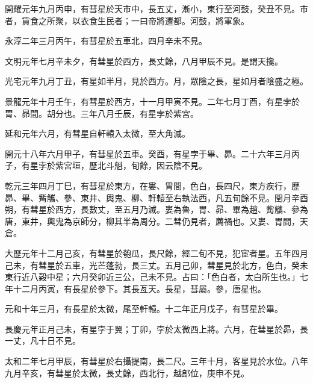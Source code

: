 \begin{pinyinscope}
 開耀元年九月丙申，有彗星於天市中，長五丈，漸小，東行至河鼓，癸丑不見。市者，貨食之所聚，以衣食生民者；一曰帝將遷都。河鼓，將軍象。



 永淳二年三月丙午，有彗星於五車北，四月辛未不見。



 文明元年七月辛未夕，有彗星於西方，長丈餘，八月甲辰不見。是謂天攙。



 光宅元年九月丁丑，有星如半月，見於西方。月，眾陰之長，星如月者陰盛之極。



 景龍元年十月壬午，有彗星於西方，十一月甲寅不見。二年七月丁酉，有星孛於胃、昴間。胡分也。三年八月壬辰，有星孛於紫宮。



 延和元年六月，有彗星自軒轅入太微，至大角滅。



 開元十八年六月甲子，有彗星於五車。癸酉，有星孛于畢、昴。二十六年三月丙子，有星孛於紫宮垣，歷北斗魁，旬餘，因云陰不見。



 乾元三年四月丁巳，有彗星於東方，在婁、胃間，色白，長四尺，東方疾行，歷昴、畢、觜觿、參、東井、輿鬼、柳、軒轅至右執法西，凡五旬餘不見。閏月辛酉朔，有彗星於西方，長數丈，至五月乃滅。婁為魯，胃、昴、畢為趙、觜觿、參為唐，東井，輿鬼為京師分，柳其半為周分。二彗仍見者，薦禍也。又婁、胃間，天倉。



 大歷元年十二月己亥，有彗星於匏瓜，長尺餘，經二旬不見，犯宦者星。五年四月己未，有彗星於五車，光芒蓬勃，長三丈。五月己卯，彗星見於北方，色白，癸未東行近八穀中星；六月癸卯近三公，己未不見。占曰：「色白者，太白所生也。」七年十二月丙寅，有長星於參下。其長亙天。長星，彗屬。參，唐星也。



 元和十年三月，有長星於太微，尾至軒轅。十二年正月戊子，有彗星於畢。



 長慶元年正月己未，有星孛于翼；丁卯，孛於太微西上將。六月，在彗星於昴，長一丈，凡十日不見。



 太和二年七月甲辰，有彗星於右攝提南，長二尺。三年十月，客星見於水位。八年九月辛亥，有彗星於太微，長丈餘，西北行，越郎位，庚申不見。




\end{pinyinscope}
